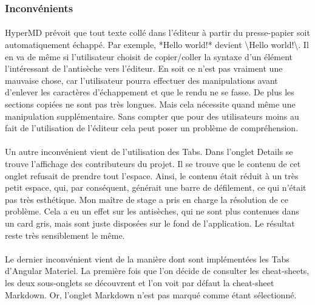 \documentclass[12pt]{article}
\begin{document}
\subsubsection{Inconvénients}
\paragraph{}
HyperMD prévoit que tout texte collé dans l'éditeur à partir du presse-papier soit automatiquement échappé. Par exemple, *Hello world!* devient \textbackslash*Hello world!\textbackslash*. Il en va de même si l'utilisateur choisit de copier/coller la syntaxe d'un élément l'intéressant de l'antisèche vers l'éditeur. En soit ce n'est pas vraiment une mauvaise chose, car l'utilisateur pourra effectuer des manipulations avant d'enlever les caractères d'échappement et que le rendu ne se fasse. De plus les sections copiées ne sont pas très longues. Mais cela nécessite quand même une manipulation supplémentaire. Sans compter que pour des utilisateurs moins au fait de l'utilisation de l'éditeur cela peut poser un problème de compréhension.
\paragraph{}
Un autre inconvénient vient de l'utilisation des Tabs. Dans l'onglet Details se trouve l'affichage des contributeurs du projet. Il se trouve que le contenu de cet onglet refusait de prendre tout l'espace. Ainsi, le contenu était réduit à un très petit espace, qui, par conséquent, générait une barre de défilement, ce qui n'était pas très esthétique. Mon maître de stage a pris en charge la résolution de ce problème. Cela a eu un effet sur les antisèches, qui ne sont plus contenues dans un card gris, mais sont juste disposées sur le fond de l'application. Le résultat reste très sensiblement le même.
\paragraph{}
Le dernier inconvénient vient de la manière dont sont implémentées les Tabs d'Angular Materiel. La première fois que l'on décide de consulter les cheat-sheets, les deux sous-onglets se découvrent et l'on voit par défaut la cheat-sheet Markdown. Or, l'onglet Markdown n'est pas marqué comme étant sélectionné.
\end{document}
